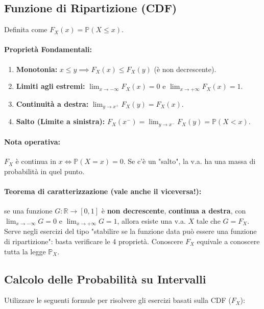 \documentclass[12pt]{extarticle} %
\begin{document}
\subsection{Funzione di Ripartizione (CDF)}
Definita come $F_X(x) = \mathbb{P}(X \le x)$. 
\paragraph{Proprietà Fondamentali:}
\begin{enumerate}
    \item \textbf{Monotonia:} $x \le y \implies F_X(x) \le F_X(y)$ (è non decrescente).
    \item \textbf{Limiti agli estremi:} $\lim_{x \to -\infty} F_X(x) = 0$ e $\lim_{x \to +\infty} F_X(x) = 1$.
    \item \textbf{Continuità a destra:} $\lim_{y \to x^+} F_X(y) = F_X(x)$.
    \item \textbf{Salto (Limite a sinistra):} $F_X(x^-) = \lim_{y \to x^-} F_X(y) = \mathbb{P}(X < x)$.
\end{enumerate}

\paragraph{Nota operativa:} $F_X$ è continua in $x \iff \mathbb{P}(X=x) = 0$. Se c'è un "salto", la v.a. ha una massa di probabilità in quel punto.

\paragraph{Teorema di caratterizzazione (vale anche il viceversa!):} se una funzione $G : \mathbb{R} \to [0,1]$ è \textbf{non decrescente}, \textbf{continua a destra}, con $\lim_{x\to-\infty} G = 0$ e $\lim_{x\to+\infty} G = 1$, allora esiste una v.a. $X$ tale che $G = F_X$. \\ {\footnotesize Serve negli esercizi del tipo "stabilire se la funzione data può essere una funzione di ripartizione": basta verificare le 4 proprietà. Conoscere $F_X$ equivale a conoscere tutta la legge $\mathbb{P}_X$.}

\newpage
\subsection{Calcolo delle Probabilità su Intervalli}
Utilizzare le seguenti formule per risolvere gli esercizi basati sulla CDF ($F_X$):
\end{document}
